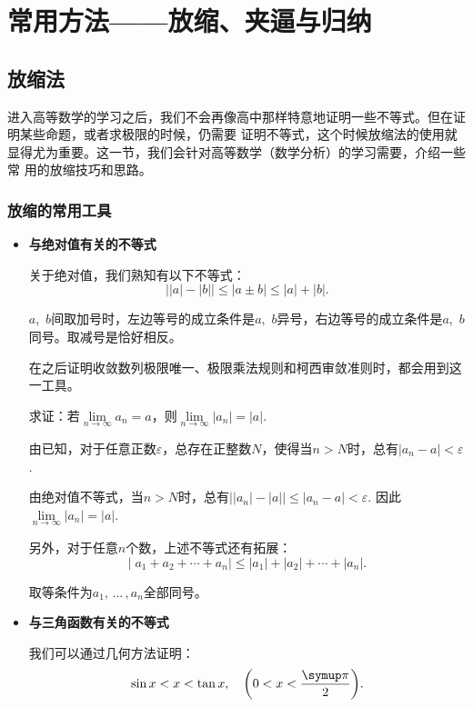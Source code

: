 \section{常用方法——放缩、夹逼与归纳}
\subsection{放缩法}
进入高等数学的学习之后，我们不会再像高中那样特意地证明一些不等式。但在证明某些命题，或者求极限的时候，仍需要
证明不等式，这个时候放缩法的使用就显得尤为重要。这一节，我们会针对高等数学（数学分析）的学习需要，介绍一些常
用的放缩技巧和思路。
\subsubsection{放缩的常用工具}


\begin{itemize}
    \item \textbf{与绝对值有关的不等式}

          关于绝对值，我们熟知有以下不等式：
          \[
              \big | \lvert a \rvert-\lvert b\rvert  \big |
              \leqslant \lvert a\pm b\rvert \leqslant \lvert a\rvert +\lvert b\rvert
              .\]

          $a$,~$b$间取加号时，左边等号的成立条件是$a$,~$b$异号，右边等号的成立条件是$a$,~$b$同号。取减号是恰好相反。

          在之后证明收敛数列极限唯一、极限乘法规则和柯西审敛准则时，都会用到这一工具。
          \begin{example}
              求证：若$\lim\limits_{n \to \infty} a_n =a$，则$\lim\limits_{n \to \infty} |a_n| =|a|$.
          \end{example}
          \begin{prove}
              由已知，对于任意正数$\varepsilon$，总存在正整数$N$，使得当$n>N$时，总有$|a_n-a|<\varepsilon$.


              由绝对值不等式，当$n>N$时，总有$\big ||a_n|-|a|\big |\leqslant |a_n-a|<\varepsilon$.
              因此$\lim\limits_{n \to \infty} |a_n| =|a|$.
          \end{prove}
          另外，对于任意$n$个数，上述不等式还有拓展：
          \[
              |\;\!a_1+a_2+\cdots +a_n|\leqslant |a_1|+|a_2|+\cdots +|a_n|
              .\]

          取等条件为$a_1,\,\dots\,,a_n$全部同号。
    \item \textbf{与三角函数有关的不等式}

          我们可以通过几何方法证明：
          \[
              \sin x<x<\tan x,\quad\left( 0<x<\frac{\symup\pi}{2} \right)
              .\]


\end{itemize}
